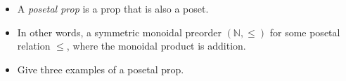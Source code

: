 \begin{itemize}
    \item A \emph{posetal prop} is a prop that is also a poset.
    \item In other words, a symmetric monoidal preorder $(\mathbb{N}, \leq)$ for some posetal relation $\leq$, where the monoidal product is addition.
    \item Give three examples of a posetal prop.
  \end{itemize}